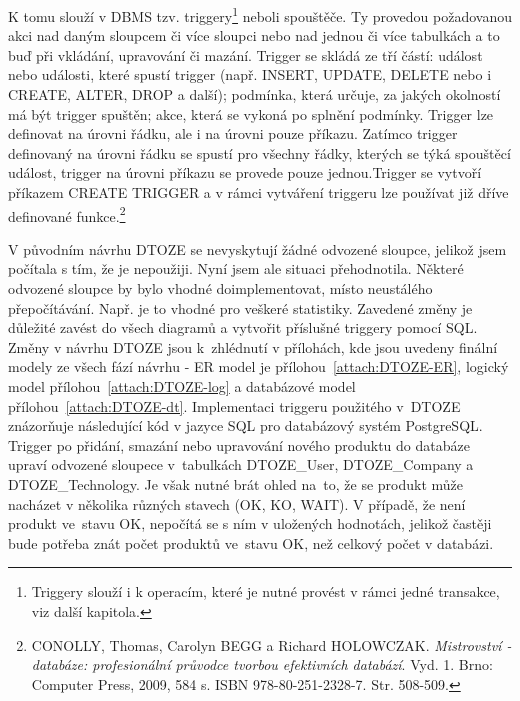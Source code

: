 \documentclass[11pt,a4paper]{article}
\begin{document}
K tomu slouží v DBMS tzv. triggery\footnote{Triggery slouží i k operacím, které je nutné provést v rámci jedné transakce, viz další kapitola.} neboli spouštěče. Ty provedou požadovanou akci nad daným sloupcem či více sloupci nebo nad jednou či více tabulkách a to buď při vkládání, upravování či mazání. Trigger se skládá ze tří částí: událost nebo události, které spustí trigger (např. INSERT, UPDATE, DELETE nebo i CREATE, ALTER, DROP a další); podmínka, která určuje, za jakých okolností má být trigger spuštěn; akce, která se vykoná po splnění podmínky. Trigger lze definovat na úrovni řádku, ale i na úrovni pouze příkazu. Zatímco trigger definovaný na úrovni řádku se spustí pro všechny řádky, kterých se týká spouštěcí událost, trigger na úrovni příkazu se provede pouze jednou.Trigger se vytvoří příkazem CREATE TRIGGER a v rámci vytváření triggeru lze používat již dříve definované funkce.\footnote{CONOLLY, Thomas, Carolyn BEGG a Richard HOLOWCZAK. \textit{Mistrovství - databáze: profesionální průvodce tvorbou efektivních databází}. Vyd. 1. Brno: Computer Press, 2009, 584 s. ISBN 978-80-251-2328-7. Str. 508-509.}  

V původním návrhu DTOZE se nevyskytují žádné odvozené sloupce, jelikož jsem počítala s tím, že je nepoužiji. Nyní jsem ale situaci přehodnotila. Některé odvozené sloupce by bylo vhodné doimplementovat, místo neustálého přepočítávání. Např. je to vhodné pro veškeré statistiky. Zavedené změny je důležité zavést do všech diagramů a vytvořit příslušné triggery pomocí SQL. Změny v návrhu DTOZE jsou k~zhlédnutí v přílohách, kde jsou uvedeny finální modely ze všech fází návrhu - ER model je přílohou~\ref{attach:DTOZE-ER}, logický model přílohou~\ref{attach:DTOZE-log} a databázové model přílohou~\ref{attach:DTOZE-dt}. Implementaci triggeru použitého v~DTOZE znázorňuje následující kód v jazyce SQL pro databázový systém PostgreSQL. Trigger po přidání, smazání nebo upravování nového produktu do databáze upraví odvozené sloupece v~tabulkách DTOZE\_User, DTOZE\_Company a DTOZE\_Technology. Je však nutné brát ohled na~to, že se produkt může nacházet v několika různých stavech (OK, KO, WAIT). V případě, že není produkt ve~stavu OK, nepočítá se s ním v uložených hodnotách, jelikož častěji bude potřeba znát počet produktů ve~stavu OK, než celkový počet v databázi. 
\end{document}
